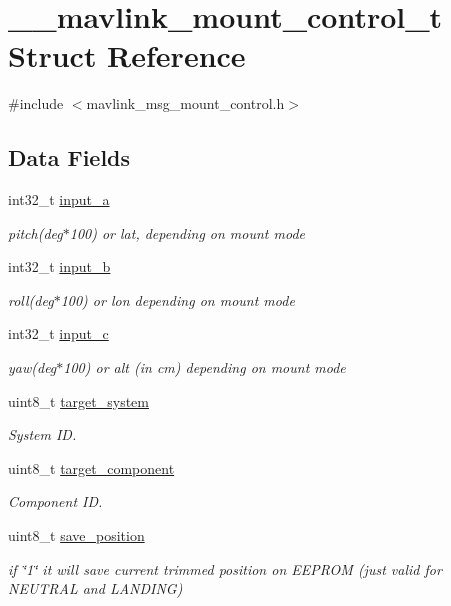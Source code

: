 \hypertarget{struct____mavlink__mount__control__t}{\section{\+\_\+\+\_\+mavlink\+\_\+mount\+\_\+control\+\_\+t Struct Reference}
\label{struct____mavlink__mount__control__t}
}


{\ttfamily \#include $<$mavlink\+\_\+msg\+\_\+mount\+\_\+control.\+h$>$}

\subsection*{Data Fields}
\begin{DoxyCompactItemize}
\item 
int32\+\_\+t \hyperlink{struct____mavlink__mount__control__t_a340cebb0b9e3b1f1564c9686cba493df}{input\+\_\+a}
\begin{DoxyCompactList}\small\item\em pitch(deg$\ast$100) or lat, depending on mount mode \end{DoxyCompactList}\item 
int32\+\_\+t \hyperlink{struct____mavlink__mount__control__t_a55ae43132ac35a60dec27dc6cc28b1cc}{input\+\_\+b}
\begin{DoxyCompactList}\small\item\em roll(deg$\ast$100) or lon depending on mount mode \end{DoxyCompactList}\item 
int32\+\_\+t \hyperlink{struct____mavlink__mount__control__t_a41dfa342dec73bb715115e6b8f086e08}{input\+\_\+c}
\begin{DoxyCompactList}\small\item\em yaw(deg$\ast$100) or alt (in cm) depending on mount mode \end{DoxyCompactList}\item 
uint8\+\_\+t \hyperlink{struct____mavlink__mount__control__t_a177fc01352e7aabd7f897cd2d9fcb60d}{target\+\_\+system}
\begin{DoxyCompactList}\small\item\em System I\+D. \end{DoxyCompactList}\item 
uint8\+\_\+t \hyperlink{struct____mavlink__mount__control__t_a7a6d068093efc260b10c484b6c323f9a}{target\+\_\+component}
\begin{DoxyCompactList}\small\item\em Component I\+D. \end{DoxyCompactList}\item 
uint8\+\_\+t \hyperlink{struct____mavlink__mount__control__t_ad1e40c626c85249aef8d74cd80382151}{save\+\_\+position}
\begin{DoxyCompactList}\small\item\em if \char`\"{}1\char`\"{} it will save current trimmed position on E\+E\+P\+R\+O\+M (just valid for N\+E\+U\+T\+R\+A\+L and L\+A\+N\+D\+I\+N\+G) \end{DoxyCompactList}\end{DoxyCompactItemize}


